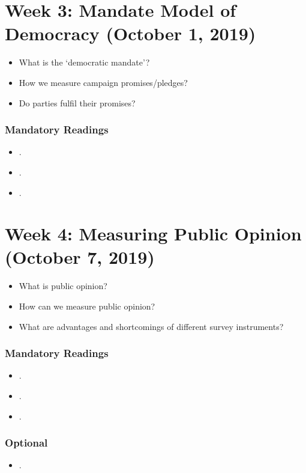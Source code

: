 \documentclass[abstract=on,parskip=full,headings=standardclasses,fontsize=11pt,paper=a4]{scrartcl}
\begin{document}
\section{Week 3:  Mandate Model of Democracy (October 1, 2019)}



\begin{itemize}
\renewcommand\labelitemi{--}
\item What is the `democratic mandate'? 
\item How we measure campaign promises/pledges?
\item Do parties fulfil their promises?
\end{itemize}

\subsubsection*{Mandatory Readings}
\begin{itemize}
\item {}.
\item {}.
\item {}.
\end{itemize}


\section{Week 4: Measuring Public Opinion (October 7, 2019)}


\begin{itemize}
\renewcommand\labelitemi{--}
\item What is public opinion?
\item How can we measure public opinion? 
\item What are advantages and shortcomings of different survey instruments?
\end{itemize}


\subsubsection*{Mandatory Readings}
\begin{itemize}
\item {}.
\item {}.
\item {}.
\end{itemize}


\subsubsection*{Optional}
\begin{itemize}
\item {}.
\end{itemize}
\end{document}
